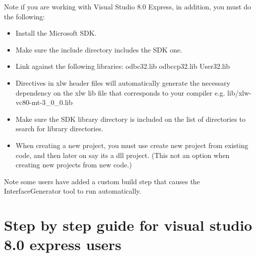 \documentclass[12pt,reqno]{amsart}
\numberwithin{equation}{section}
\numberwithin{figure}{section}
\begin{document}
Note if you are working with Visual Studio 8.0 Express, in addition, you must do
the following:   
\begin{itemize}
\item Install the Microsoft SDK.
\item Make sure the include directory includes the SDK one.
\item Link against the following libraries: odbc32.lib
  odbccp32.lib User32.lib
\item Directives in xlw header files will automatically generate the necessary
  dependency on the xlw lib file that corresponds to your compiler e.g.
  lib/xlw-vc80-mt-3\_0\_0.lib
\item Make sure the SDK library directory is included on the list of
  directories to search for library directories. 
\item When creating a new project, you must use create new project
  from existing code, and then later on say its a dll project. (This
  not an option when creating new projects from new code.)
\end{itemize}

Note some users have added a custom build step that causes the
InterfaceGenerator tool to run automatically. 

\section{Step by step guide for visual studio 8.0 express users}
\end{document}
